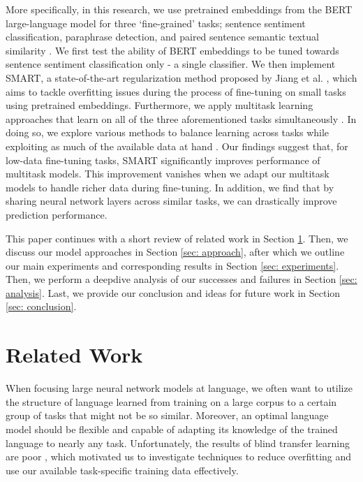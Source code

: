 \documentclass{article}
\begin{document}
More specifically, in this research, we use pretrained embeddings from the BERT large-language model for three `fine-grained' tasks; sentence sentiment classification, paraphrase detection, and paired sentence semantic textual similarity \cite{wang2018glue}.
We first test the ability of BERT embeddings to be tuned towards sentence sentiment classification only - a single classifier. We then implement SMART, a state-of-the-art regularization method proposed by Jiang et al. \cite{smart}, which aims to tackle overfitting issues during the process of fine-tuning on small tasks using pretrained embeddings. Furthermore, we apply multitask learning approaches that learn on all of the three aforementioned tasks simultaneously \cite{intro}. In doing so, we explore various methods to balance learning across tasks while exploiting as much of the available data at hand \cite{MTL}. Our findings suggest that, for low-data fine-tuning tasks, SMART significantly improves performance of multitask models. This improvement vanishes when we adapt our multitask models to handle richer data during fine-tuning. In addition, we find that by sharing neural network layers across similar tasks, we can drastically improve prediction performance.

This paper continues with a short review of related work in Section \ref{sec: related-work}. Then, we discuss our model approaches in Section \ref{sec: approach}, after which we outline our main experiments and corresponding results in Section \ref{sec: experiments}. Then, we perform a deepdive analysis of our successes and failures in Section \ref{sec: analysis}. Last, we provide our conclusion and ideas for future work in Section \ref{sec: conclusion}. 

\section{Related Work}
\label{sec: related-work}

When focusing large neural network models at language, we often want to utilize the structure of language learned from training on a large corpus to a certain group of tasks that might not be so similar. Moreover, an optimal language model should be flexible and capable of adapting its knowledge of the trained language to nearly any task. Unfortunately, the results of blind transfer learning are poor \cite{bert}, which motivated us to investigate techniques to reduce overfitting and use our available task-specific training data effectively. 
\end{document}
